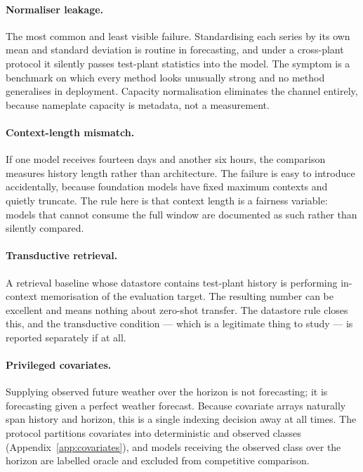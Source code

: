 \paragraph{Normaliser leakage.} The most common and least visible failure. Standardising each
series by its own mean and standard deviation is routine in forecasting, and under a
cross-plant protocol it silently passes test-plant statistics into the model. The symptom is a
benchmark on which every method looks unusually strong and no method generalises in
deployment. Capacity normalisation eliminates the channel entirely, because nameplate capacity
is metadata, not a measurement.

\paragraph{Context-length mismatch.} If one model receives fourteen days and another six
hours, the comparison measures history length rather than architecture. The failure is easy to
introduce accidentally, because foundation models have fixed maximum contexts and quietly
truncate. The rule here is that context length is a fairness variable: models that cannot
consume the full window are documented as such rather than silently compared.

\paragraph{Transductive retrieval.} A retrieval baseline whose datastore contains test-plant
history is performing in-context memorisation of the evaluation target. The resulting number
can be excellent and means nothing about zero-shot transfer. The datastore rule closes this,
and the transductive condition --- which is a legitimate thing to study --- is reported
separately if at all.

\paragraph{Privileged covariates.} Supplying observed future weather over the horizon is not
forecasting; it is forecasting given a perfect weather forecast. Because covariate arrays
naturally span history and horizon, this is a single indexing decision away at all times. The
protocol partitions covariates into deterministic and observed classes
(Appendix~\ref{app:covariates}), and models receiving the observed class over the horizon are
labelled oracle and excluded from competitive comparison.

